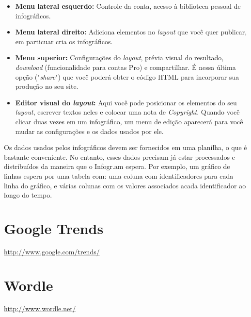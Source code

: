 \documentclass[12pt,onecolumn]{article}
\begin{document}
  \begin{itemize}
    \item
      \textbf{Menu lateral esquerdo:}
      Controle da conta, acesso à biblioteca pessoal de
      infográficos.
    \item
      \textbf{Menu lateral direito:}
      Adiciona elementos no \textit{layout} que você quer
      publicar, em particuar cria os infográficos.
    \item
      \textbf{Menu superior:}
      Configurações do \textit{layout}, prévia visual do resultado,
      \textit{download} (funcionalidade para contas Pro) e compartilhar. É nessa
      última opção ("\textit{share}") que você poderá obter o código HTML para
      incorporar sua produção no seu site.
    \item
      \textbf{Editor visual do \textit{layout}:}
      Aqui você pode posicionar os elementos do seu \textit{layout}, escrever
      textos neles e colocar uma nota de \textit{Copyright}. Quando você clicar
      duas vezes em um infográfico, um menu de edição aparecerá para você mudar
      as configurações e os dados usados por ele.
  \end{itemize}
  
  Os dados usados pelos infográficos devem ser fornecidos em uma planilha, o que
  é bastante conveniente. No entanto, esses dados precisam já estar processados
  e distribuídos da maneira que o Infogr.am espera. Por exemplo, um gráfico de
  linhas espera por uma tabela com: uma coluna com identificadores para cada
  linha do gráfico, e várias colunas com os valores associados acada
  identificador ao longo do tempo.

\clearpage
\section{Google Trends}
  \url{http://www.google.com/trends/}

\clearpage
\section{Wordle}
  \url{http://www.wordle.net/}
\end{document}
